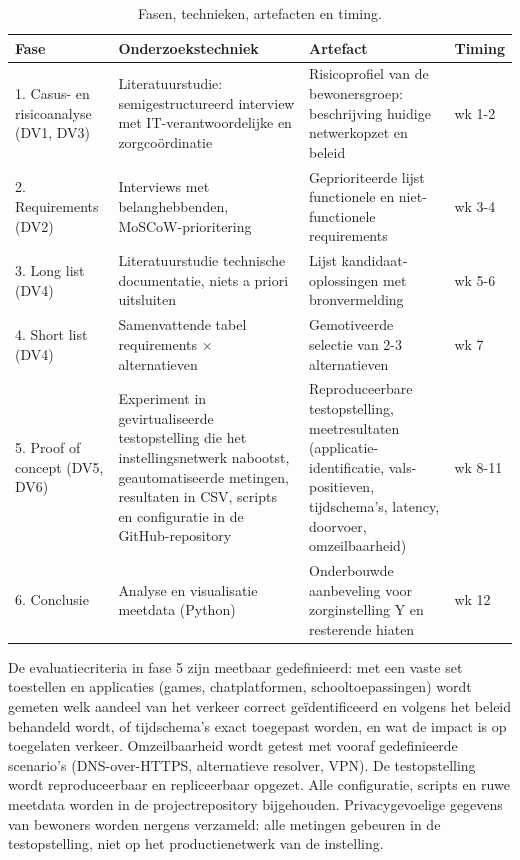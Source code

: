 \documentclass{hogent-article}
\begin{document}
\begin{table}
    \centering
    \small
    \begin{tabular}{p{2.6cm}p{5.4cm}p{5.4cm}p{1.4cm}}
        \toprule
        \textbf{Fase} & \textbf{Onderzoekstechniek} & \textbf{Artefact} & \textbf{Timing} \\
        \midrule
        1. Casus- en risicoanalyse (DV1, DV3) & Literatuurstudie: semigestructureerd interview met IT-verantwoordelijke en zorgcoördinatie & Risicoprofiel van de bewonersgroep: beschrijving huidige netwerkopzet en beleid & wk 1-2 \\
        2. Requirements (DV2) & Interviews met belanghebbenden, MoSCoW-prioritering & Geprioriteerde lijst functionele en niet-functionele requirements & wk 3-4 \\
        3. Long list (DV4) & Literatuurstudie technische documentatie, niets a priori uitsluiten & Lijst kandidaat-oplossingen met bronvermelding & wk 5-6 \\
        4. Short list (DV4) & Samenvattende tabel requirements $\times$ alternatieven & Gemotiveerde selectie van 2-3 alternatieven & wk 7 \\
        5. Proof of concept (DV5, DV6) & Experiment in gevirtualiseerde testopstelling die het instellingsnetwerk nabootst, geautomatiseerde metingen, resultaten in CSV, scripts en configuratie in de GitHub-repository & Reproduceerbare testopstelling, meetresultaten (applicatie-identificatie, vals-positieven, tijdschema's, latency, doorvoer, omzeilbaarheid) & wk 8-11 \\
        6. Conclusie & Analyse en visualisatie meetdata (Python) & Onderbouwde aanbeveling voor zorginstelling Y en resterende hiaten & wk 12 \\
        \bottomrule
    \end{tabular}
    \caption{\label{tab:fasen-inter}Fasen, technieken, artefacten en timing.}
\end{table}

De evaluatiecriteria in fase 5 zijn meetbaar gedefinieerd: met een vaste set toestellen en applicaties (games, chatplatformen, schooltoepassingen) wordt gemeten welk aandeel van het verkeer correct geïdentificeerd en volgens het beleid behandeld wordt, of tijdschema's exact toegepast worden, en wat de impact is op toegelaten verkeer. Omzeilbaarheid wordt getest met vooraf gedefinieerde scenario's (DNS-over-HTTPS, alternatieve resolver, VPN). De testopstelling wordt reproduceerbaar en repliceerbaar opgezet. Alle configuratie, scripts en ruwe meetdata worden in de projectrepository bijgehouden. Privacygevoelige gegevens van bewoners worden nergens verzameld: alle metingen gebeuren in de testopstelling, niet op het productienetwerk van de instelling.

\printbibliography[heading=bibintoc]
\end{document}
